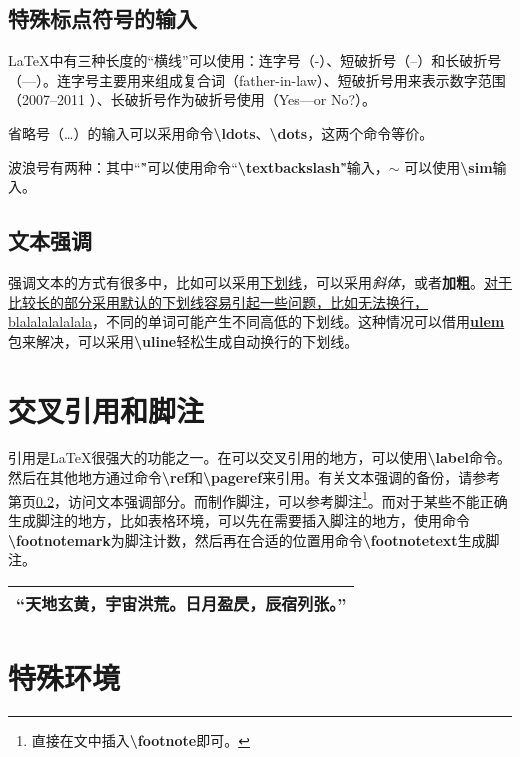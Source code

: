 \documentclass[utf8]{book}
\newcommand{\latexcommand}[1]{\textbf{\textbackslash #1}}
\newcommand{\latexpackage}[1]{\textbf{\underline{#1}}}
\begin{document}
	\subsection{特殊标点符号的输入}
		\LaTeX 中有三种长度的“横线”可以使用：连字号（-）、短破折号（--）和长破折号（---）。连字号主要用来组成复合词（father-in-law）、短破折号用来表示数字范围（2007--2011 ）、长破折号作为破折号使用（Yes---or No?）。
	
		省略号（\ldots）的输入可以采用命令\latexcommand{ldots}、\latexcommand{dots}，这两个命令等价。
	
		波浪号有两种：其中“\~ ”可以使用命令“\latexcommand{textbackslash}\~”输入，$ \sim $ 可以使用\latexcommand{sim}输入。
		
	\subsection{文本强调}\label{text_emphasis}
		强调文本的方式有很多中，比如可以采用\underline{下划线}，可以采用\textit{斜体}，或者\textbf{加粗}。\underline{对于比较长的部分采用默认的下划线容易引起一些问题，比如无法换行，blalalalalalala}，不同的单词可能产生不同高低的下划线。这种情况可以借用\latexpackage{ulem}包来解决，可以采用\latexcommand{uline}轻松生成自动换行的下划线。
		
	\section{交叉引用和脚注}
		引用是\LaTeX 很强大的功能之一。在可以交叉引用的地方，可以使用\latexcommand{label}命令。然后在其他地方通过命令\latexcommand{ref}和\latexcommand{pageref}来引用。有关文本强调的备份，请参考第\pageref{text_emphasis}页\ref{text_emphasis}，访问文本强调部分。而制作脚注，可以参考脚注\footnote{直接在文中插入\latexcommand{footnote}即可。}。而对于某些不能正确生成脚注的地方，比如表格环境，可以先在需要插入脚注的地方，使用命令\latexcommand{footnotemark}为脚注计数，然后再在合适的位置用命令\latexcommand{footnotetext}生成脚注。
		
		\begin{tabular}{l}
			\hline
			“天地玄黄，宇宙洪荒。日月盈昃，辰宿列张。”\footnotemark \\
			\hline
		\end{tabular}
		
	\section{特殊环境}
\end{document}
